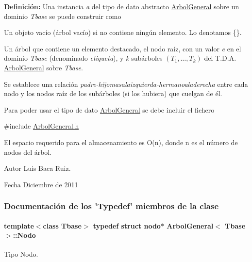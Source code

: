 {\bfseries Definición\-:} Una instancia {\itshape a} del tipo de dato abstracto \hyperlink{classArbolGeneral}{Arbol\-General} sobre un dominio {\itshape Tbase} se puede construir como


\begin{DoxyItemize}
\item Un objeto vacío (árbol vacío) si no contiene ningún elemento. Lo denotamos \{\}.
\item Un árbol que contiene un elemento destacado, el nodo raíz, con un valor {\itshape e} en el dominio {\itshape Tbase} (denominado {\itshape etiqueta}), y {\itshape k} subárboles $(T_1, \ldots, T_k)$ del T.\-D.\-A. \hyperlink{classArbolGeneral}{Arbol\-General} sobre {\itshape Tbase}.
\end{DoxyItemize}

Se establece una relación {\itshape padre-\/hijomasalaizquierda-\/hermanoaladerecha} entre cada nodo y los nodos raíz de los subárboles (si los hubiera) que cuelgan de él.

Para poder usar el tipo de dato \hyperlink{classArbolGeneral}{Arbol\-General} se debe incluir el fichero

{\ttfamily \#include \hyperlink{ArbolGeneral_8h}{Arbol\-General.\-h}}

El espacio requerido para el almacenamiento es O(n), donde n es el número de nodos del árbol.

\begin{DoxyAuthor}{Autor}
Luis Baca Ruiz. 
\end{DoxyAuthor}
\begin{DoxyDate}{Fecha}
Diciembre de 2011 
\end{DoxyDate}


\subsubsection{Documentación de los 'Typedef' miembros de la clase}
\hypertarget{classArbolGeneral_a12cc1b74a9095d89bc7334290d332f7a}{
\paragraph[{Nodo}]{\setlength{\rightskip}{0pt plus 5cm}template$<$class Tbase$>$ typedef struct {\bf nodo}$\ast$ {\bf Arbol\-General}$<$ Tbase $>$\-::{\bf Nodo}}}\label{classArbolGeneral_a12cc1b74a9095d89bc7334290d332f7a}


Tipo Nodo. 

